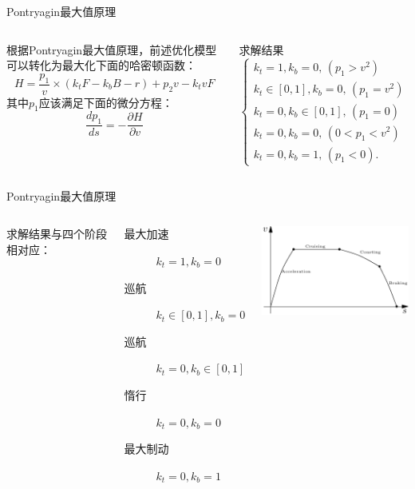\documentclass{beamer}
\begin{document}
\begin{frame}{Pontryagin最大值原理}
\begin{columns}[c]
    \column{6.5cm}
        根据Pontryagin最大值原理，前述优化模型可以转化为最大化下面的哈密顿函数：
        \begin{equation*}
          H = \frac{p_1}{v} \times (k_t F - k_b B - r) + p_2 v - k_t v F
        \end{equation*}
        其中$p_1$应该满足下面的微分方程：
        \begin{equation*}
          \frac{dp_1}{ds} = - \frac{\partial H}{\partial v}
        \end{equation*}
    \column{5.5cm}
    \begin{block}{求解结果}
    \begin{equation*}
      \left\{
        \begin{array}{l}
        k_t = 1, k_b = 0, \, (p_1>v^2) \\
        k_t \in [0,1], k_b = 0, \, (p_1 = v^2) \\
        k_t = 0, k_b \in [0,1], \, (p_1 = 0) \\
        k_t = 0, k_b = 0, \, (0 < p_1 < v^2) \\
        k_t = 0, k_b = 1, \, (p_1 < 0).
        \end{array}
      \right.
    \end{equation*}
    \end{block}
\end{columns}
\end{frame}

\begin{frame}{Pontryagin最大值原理}
\begin{columns}[c]
\column{5cm}
求解结果与四个阶段相对应：
\begin{description}
  \item[最大加速] $k_t = 1, k_b = 0$
  \item[巡航] $k_t \in [0,1], k_b = 0$
  \item[巡航] $k_t = 0, k_b \in [0,1]$
  \item[惰行] $k_t = 0, k_b = 0$
  \item[最大制动] $k_t = 0, k_b = 1$
\end{description}

\column{7cm} \includegraphics[width=7cm]{fig/fig4/fig4.pdf}
\end{columns}
\end{frame}
\end{document}
